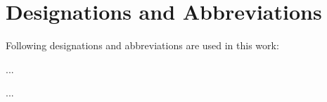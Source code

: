 \chapter{Designations and Abbreviations}
\begin{SingleSpace}

Following designations and abbreviations are used in this work:\par\bigskip

\begin{description}[style=multiline,leftmargin=3.2cm,labelwidth=3.2cm]

  \item[...]   ...
  \item[...]   ...
 
\end{description}
\end{SingleSpace}

\newpage